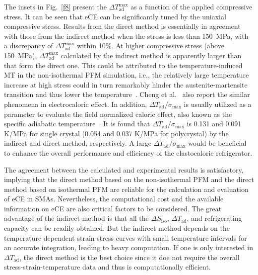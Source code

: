 \documentclass[reprint,3p,sort&compress,times,onecolumn]{elsarticle}
\begin{document}
The insets in Fig.~\ref{f8} present the $\Delta T_{\text{ad}}^{\text{max}}$ as a function of the applied compressive stress. It can be seen that eCE can be significantly tuned by the uniaxial compressive stress. Results from the direct method is essentially in agreement with those from the indirect method when the stress is less than 150~MPa, with a discrepancy of $\Delta T_{\text{ad}}^{\text{max}}$ within 10$\%$. At higher compressive stress (above 150~MPa), $\Delta T_{\text{ad}}^{\text{max}}$ calculated by the indirect method is apparently larger than that form the direct one. This could be attributed to the temperature-induced MT in the non-isothermal PFM simulation, i.e., the relatively large temperature increase at high stress could in turn remarkably hinder the austenite-martensite transition and thus lower the temperature~\cite{chen2021improved}. Cheng et al.~\cite{Cheng2020} also report the similar phenomena in electrocaloric effect. In addition, $\Delta T_{\text{ad}}/\sigma_{\text{max}}$ is usually utilized as a parameter to evaluate the field normalized caloric effect, also known as the specific adiabatic temperature~\cite{xu2016giant}. It is found that $\Delta T_{\text{ad}}/\sigma_{\text{max}}$ is 0.131 and 0.091 K/MPa for single crystal (0.054 and 0.037 K/MPa for polycrystal) by the indirect and direct method, respectively. A large $\Delta T_{\text{ad}}/\sigma_{\text{max}}$ would be beneficial to enhance the overall performance and efficiency of the elastocaloric refrigerator.


The agreement between the calculated and experimental results is satisfactory, implying that the direct method based on the non-isothermal PFM and the direct method based on isothermal PFM are reliable for the calculation and evaluation of eCE in SMAs. Nevertheless, the computational cost and the available information on eCE are also critical factors to be considered. The great advantage of the indirect method is that all the $\Delta S_{\text{iso}}$, $\Delta T_{\text{ad}}$, and refrigerating capacity can be readily obtained. But the indirect method depends on the temperature dependent strain-stress curves with small temperature intervals for an accurate integration, leading to heavy computation. If one is only interested in $\Delta T_{\text{ad}}$, the direct method is the best choice since it doe not require the overall stress-strain-temperature data and thus is computationally efficient.
\end{document}
